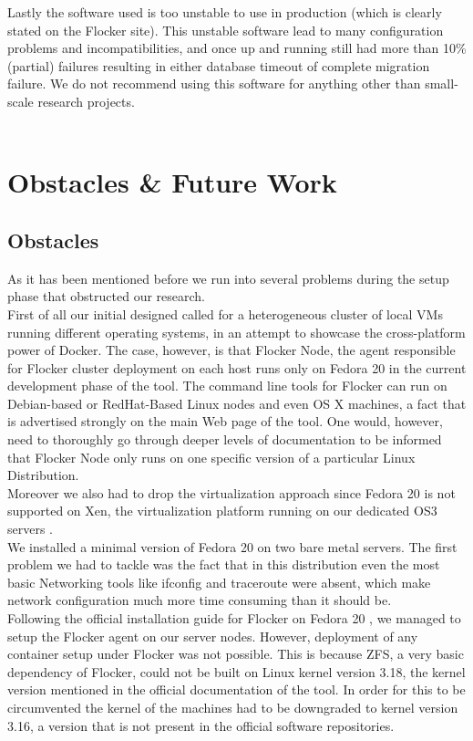 \documentclass{article}
\begin{document}
Lastly the software used is too unstable to use in production (which is clearly stated on the Flocker site). This unstable software lead to many configuration problems and incompatibilities, and once up and running still had more than 10\% (partial) failures resulting in either database timeout of complete migration failure. We do not recommend using this software for anything other than small-scale research projects. \\ \\


\clearpage
\section{Obstacles \& Future Work}
\subsection{Obstacles}
As it has been mentioned before we run into several problems during the setup phase that obstructed our research.\\
First of all our initial designed called for a heterogeneous cluster of local VMs running different operating systems, in an attempt to showcase the cross-platform power of Docker. The case, however, is that Flocker Node, the agent responsible for Flocker cluster deployment on each host runs only on Fedora 20 in the current development phase of the tool. The command line tools for Flocker can run on Debian-based or RedHat-Based Linux nodes and even OS X machines, a fact that is advertised strongly on the main Web page of the tool\cite{flocker-page}. One would, however, need to thoroughly go through deeper levels of documentation to be informed that Flocker Node only runs on one specific version of a particular Linux Distribution.\\
Moreover we also had to drop the virtualization approach since Fedora 20 is not supported on Xen, the virtualization platform running on our dedicated OS3 servers \cite{Xen}.\\
We installed a minimal version of Fedora 20 on two bare metal servers. The first problem we had to tackle was the fact that in this distribution even the most basic Networking tools like ifconfig and traceroute were absent, which make network configuration much more time consuming than it should be.\\
Following the official installation guide for Flocker on Fedora 20 \cite{flocker-install}, we managed to setup the Flocker agent on our server nodes. However, deployment of any container setup under Flocker was not possible. This is because ZFS, a very basic dependency of Flocker, could not be built on Linux kernel version 3.18, the kernel version mentioned in the official documentation of the tool. In order for this to be circumvented the kernel of the machines had to be downgraded to kernel version 3.16, a version that is not present in the official software repositories.\\
\end{document}
